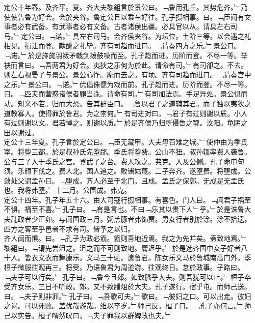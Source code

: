 \documentclass{zhvt-classic}
\begin{document}
\hspace*{2em}定公十年春。及齐平。夏。齐大夫黎鉏言於景公曰。﹁鲁用孔丘。其势危齐。﹂乃使使告鲁为好会。会於夹谷。鲁定公且以乘车好往。孔子摄相事。曰。﹁臣闻有文事者必有武备。有武事者必有文备。古者诸侯出疆。必具官以从。请具左右司马。﹂定公曰。﹁诺。﹂具左右司马。会齐侯夹谷。为坛位。土阶三等。以会遇之礼相见。揖让而登。献酬之礼毕。齐有司趋而进曰。﹁请奏四方之乐。﹂景公曰。﹁诺。﹂於是旍旄羽袚矛戟剑拨鼓噪而至。孔子趋而进。历阶而登。不尽一等。举袂而言曰。﹁吾两君为好会。夷狄之乐何为於此。请命有司。﹂有司卻之。不去。则左右视晏子与景公。景公心怍。麾而去之。有顷。齐有司趋而进曰。﹁请奏宫中之乐。﹂景公曰。﹁诺。﹂优倡侏儒为戏而前。孔子趋而进。历阶而登。不尽一等。曰。﹁匹夫而营惑诸侯者罪当诛。请命有司。﹂有司加法焉。手足异处。景公惧而动。知义不若。归而大恐。告其群臣曰。﹁鲁以君子之道辅其君。而子独以夷狄之道教寡人。使得罪於鲁君。为之柰何。﹂有司进对曰。﹁君子有过则谢以质。小人有过则谢以文。君若悼之。则谢以质。﹂於是齐侯乃归所侵鲁之郓。汶阳。龟阴之田以谢过。\\
\hspace*{2em}定公十三年夏。孔子言於定公曰。﹁臣无藏甲。大夫毋百雉之城。﹂使仲由为季氏宰。将堕三都。於是叔孙氏先堕郈。季氏将堕费。公山不狃。叔孙辄率费人袭鲁。公与三子入于季氏之宫。登武子之台。费人攻之。弗克。入及公侧。孔子命申句须。乐颀下伐之。费人北。国人追之。败诸姑蔑。二子奔齐。遂堕费。将堕成。公敛处父谓孟孙曰。﹁堕成。齐人必至于北门。且成。孟氏之保鄣。无成是无孟氏也。我将弗堕。﹂十二月。公围成。弗克。\\
\hspace*{2em}定公十四年。孔子年五十六。由大司寇行摄相事。有喜色。门人曰。﹁闻君子祸至不惧。福至不喜。﹂孔子曰。﹁有是言也。不曰﹁乐其以贵下人﹂乎。﹂於是诛鲁大夫乱政者少正卯。与闻国政三月。粥羔豚者弗饰贾。男女行者别於涂。涂不拾遗。四方之客至乎邑者不求有司。皆予之以归。\\
\hspace*{2em}齐人闻而惧。曰。﹁孔子为政必霸。霸则吾地近焉。我之为先并矣。盍致地焉。﹂黎鉏曰。﹁请先尝沮之。沮之而不可则致地。庸迟乎。﹂於是选齐国中女子好者八十人。皆衣文衣而舞康乐。文马三十驷。遗鲁君。陈女乐文马於鲁城南高门外。季桓子微服往观再三。将受。乃语鲁君为周道游。往观终日。怠於政事。子路曰。﹁夫子可以行矣。﹂孔子曰。﹁鲁今且郊。如致膰乎大夫。则吾犹可以止。﹂桓子卒受齐女乐。三日不听政。郊。又不致膰俎於大夫。孔子遂行。宿乎屯。而师己送。曰。﹁夫子则非罪。﹂孔子曰。﹁吾歌可夫。﹂歌曰。﹁彼妇之口。可以出走。彼妇之谒。可以死败。盖优哉游哉。维以卒岁。﹂师己反。桓子曰。﹁孔子亦何言。﹂师己以实告。桓子喟然叹曰。﹁夫子罪我以群婢故也夫。﹂\\
\end{document}
